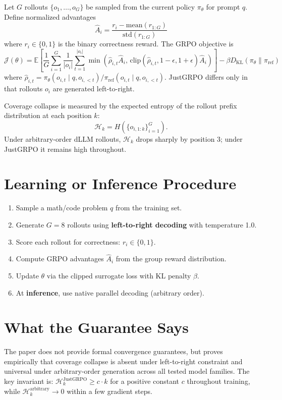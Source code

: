 \documentclass[10pt,twocolumn]{article}
\begin{document}
Let $G$ rollouts $\{o_1, \ldots, o_G\}$ be sampled from the current policy
$\pi_\theta$ for prompt $q$. Define normalized advantages
\[
\hat{A}_i = \frac{r_i - \text{mean}(r_{1:G})}{\text{std}(r_{1:G})}
\]
where $r_i \in \{0, 1\}$ is the binary correctness reward. The GRPO objective is
\[
\mathcal{J}(\theta) = \mathbb{E}\!\left[\frac{1}{G}\sum_{i=1}^{G}\frac{1}{|o_i|}
  \sum_{t=1}^{|o_i|}\min\!\left(
    \hat{\rho}_{i,t}\hat{A}_i,\,
    \text{clip}\!\left(\hat{\rho}_{i,t},1{-}\epsilon,1{+}\epsilon\right)\!\hat{A}_i
  \right)\!\right]
  - \beta D_{\mathrm{KL}}(\pi_\theta \| \pi_{\mathrm{ref}})
\]
where $\hat{\rho}_{i,t} = \pi_\theta(o_{i,t}\mid q, o_{i,<t}) / \pi_{\mathrm{ref}}(o_{i,t}\mid q, o_{i,<t})$.
JustGRPO differs only in that rollouts $o_i$ are generated left-to-right.

Coverage collapse is measured by the expected entropy of the rollout prefix
distribution at each position $k$:
\[
\mathcal{H}_k = H\!\left(\{o_{i,1:k}\}_{i=1}^{G}\right).
\]
Under arbitrary-order dLLM rollouts, $\mathcal{H}_k$ drops sharply by position 3;
under JustGRPO it remains high throughout.

\section{Learning or Inference Procedure}

\begin{enumerate}[itemsep=2pt,parsep=0pt]
  \item Sample a math/code problem $q$ from the training set.
  \item Generate $G = 8$ rollouts using \textbf{left-to-right decoding} with
    temperature 1.0.
  \item Score each rollout for correctness: $r_i \in \{0,1\}$.
  \item Compute GRPO advantages $\hat{A}_i$ from the group reward distribution.
  \item Update $\theta$ via the clipped surrogate loss with KL penalty $\beta$.
  \item At \textbf{inference}, use native parallel decoding (arbitrary order).
\end{enumerate}

\section{What the Guarantee Says}

The paper does not provide formal convergence guarantees, but proves
empirically that coverage collapse is absent under left-to-right constraint
and universal under arbitrary-order generation across all tested model families.
The key invariant is: $\mathcal{H}_k^{\text{JustGRPO}} \geq c \cdot k$ for
a positive constant $c$ throughout training, while
$\mathcal{H}_k^{\text{arbitrary}} \to 0$ within a few gradient steps.
\end{document}
